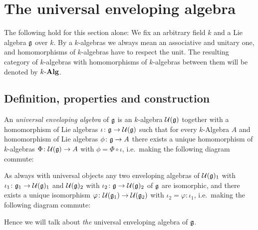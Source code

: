 \section{The universal enveloping algebra}
The following hold for this section alone: We fix an arbitrary field $k$ and a Lie algebra $\mathfrak{g}$ over $k$. By a $k$-algebras we always mean an associative and unitary one, and homomorphisms of $k$-algebras have to respect the unit. The resulting category of $k$-algebras with homomorphisms of $k$-algebras between them will be denoted by $k\text{-}\mathbf{Alg}$.





\subsection{Definition, properties and construction}


\begin{defi}
 An \emph{universal enveloping algebra} of $\mathfrak{g}$ is an $k$-algebra $\mathcal{U}(\mathfrak{g})$ together with a homomorphism of Lie algebras $\iota \colon \mathfrak{g} \to \mathcal{U}(\mathfrak{g})$ such that for every $k$-Algebra $A$ and homomorphism of Lie algebras $\phi \colon \mathfrak{g} \to A$ there exists a unique homomorphism of $k$-algebras $\Phi \colon \mathcal{U}(\mathfrak{g}) \to A$ with $\phi = \Phi \circ \iota$, i.e.\ making the following diagram commute:
 \begin{center}
 \end{center}
\end{defi}


\begin{rem}
 As always with universal objects any two enveloping algebras of $\mathcal{U}(\mathfrak{g})_1$ with $\iota_1 \colon \mathfrak{g}_1 \to \mathcal{U}(\mathfrak{g})_1$ and $\mathcal{U}(\mathfrak{g})_2$ with $\iota_2 \colon \mathfrak{g} \to \mathcal{U}(\mathfrak{g})_2$ of $\mathfrak{g}$ are isomorphic, and there exists a unique isomorphism $\varphi \colon \mathcal{U}(\mathfrak{g}_1) \to \mathcal{U}(\mathfrak{g}_2)$ with $\iota_2 = \varphi \colon \iota_1$, i.e.\ making the following diagram commute:
 \begin{center}
 \end{center}
 Hence we will talk about \emph{the} universal enveloping algebra of $\mathfrak{g}$.
\end{rem}


